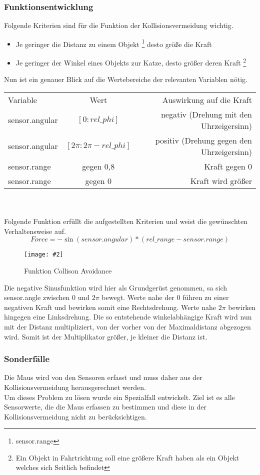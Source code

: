 \documentclass[
a4paper,     %
12pt         %
]{scrartcl}  %
\newcommand{\mygraphics}[3]{
\begin{figure}[!h]
  \begin{center}
    \texttt{[image: \#2]} \\
    \caption{#3}\label{fig:#2}
  \end{center}
\end{figure}

}
\begin{document}
\subsubsection{Funktionsentwicklung}
\label{collision}
Folgende Kriterien sind für die Funktion der Kollisionsvermeidung wichtig.
\begin{itemize}
\item Je geringer die Distanz zu einem Objekt \footnote {sensor.range} desto größe die Kraft
\item Je geringer der Winkel eines Objekts zur Katze, desto größer deren Kraft \footnote{Ein Objekt in Fahrtrichtung soll eine größere Kraft haben als ein Objekt welches sich Seitlich befindet}
\end{itemize}
Nun ist ein genauer Blick auf die Wertebereiche der relevanten Variablen nötig.\\
\begin{tabular}[h]{|l|c|r|}
\hline
Variable & Wert & Auswirkung auf die Kraft \\
sensor.angular & $[0 : rel\_phi]$ & negativ (Drehung mit den Uhrzeigersinn) \\
sensor.angular & $[2\pi : 2\pi-rel\_phi]$ & positiv (Drehung gegen den Uhrzeigersinn) \\
sensor.range & gegen 0,8  & Kraft gegen 0 \\
sensor.range & gegen 0 & Kraft wird größer \\
\hline
\end{tabular}
\\
\\
Folgende Funktion erfüllt die aufgestellten Kriterien und weist die gewünschten Verhaltensweise auf.
\[ Force= -\sin(sensor.angular) * (rel\_range-sensor.range) \]
\mygraphics{0.7\textwidth}{Kollision.png}{Funktion
Collison Avoidance}
Die negative Sinusfunktion wird hier als Grundgerüst genommen, sa sich sensor.angle zwischen 0 und $2\pi$ bewegt. Werte nahe der 0 führen zu einer negativen Kraft und bewirken somit eine Rechtsdrehung. Werte nahe $2\pi $ bewirken hingegen eine Linksdrehung. Die so entstehende winkelabhängige Kraft wird  nun mit der Distanz multipliziert, von der vorher von der Maximaldistanz abgezogen wird. Somit ist der Multiplikator größer, je kleiner die Distanz ist.
\subsubsection{Sonderfälle}
Die Maus wird von den Sensoren erfasst und muss daher aus der Kollisionsvermeidung herausgerechnet werden.\\
Um dieses Problem zu lösen wurde ein Spezialfall entwickelt.
Ziel ist es alle Sensorwerte, die die Maus erfassen zu bestimmen und diese in der Kollisionsvermeidung nicht  zu berücksichtigen. \\
\end{document}
